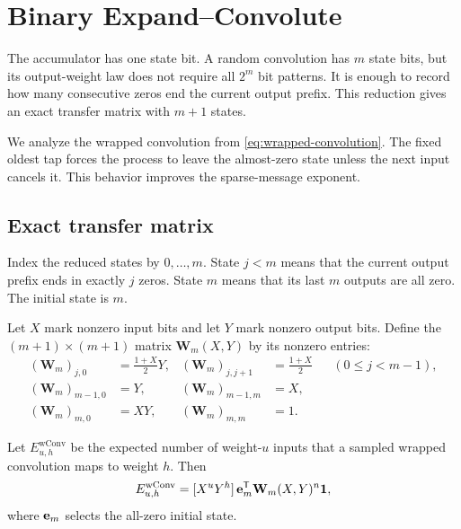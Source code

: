 \section{Binary Expand--Convolute}
\label{sec:binary-ec}

The accumulator has one state bit.  A random convolution has $m$ state bits,
but its output-weight law does not require all $2^m$ bit patterns.  It is
enough to record how many consecutive zeros end the current output prefix.
This reduction gives an exact transfer matrix with $m+1$ states.

We analyze the wrapped convolution from \eqref{eq:wrapped-convolution}.  The
fixed oldest tap forces the process to leave the almost-zero state unless the
next input cancels it.  This behavior improves the sparse-message exponent.

\subsection{Exact transfer matrix}

Index the reduced states by $0,\ldots,m$.  State $j<m$ means that the current
output prefix ends in exactly $j$ zeros.  State $m$ means that its last $m$
outputs are all zero.  The initial state is $m$.

Let $X$ mark nonzero input bits and let $Y$ mark nonzero output bits.  Define
the $(m+1)\times(m+1)$ matrix $\mathbf W_m(X,Y)$ by its nonzero entries:
\begin{align}
 (\mathbf W_m)_{j,0}&=\frac{1+X}{2}Y,&
 (\mathbf W_m)_{j,j+1}&=\frac{1+X}{2}
 &&(0\leq j<m-1),
 \label{eq:ec-active-transitions}\\
 (\mathbf W_m)_{m-1,0}&=Y,&
 (\mathbf W_m)_{m-1,m}&=X,
 \label{eq:ec-critical-transitions}\\
 (\mathbf W_m)_{m,0}&=XY,&
 (\mathbf W_m)_{m,m}&=1.
 \label{eq:ec-zero-transitions}
\end{align}

\begin{lemma}
\label{lem:ec-exact-enumerator}
Let $E^{\mathrm{wConv}}_{u,h}$ be the expected number of weight-$u$ inputs
that a sampled wrapped convolution maps to weight $h$.  Then
\begin{equation}
 E^{\mathrm{wConv}}_{u,h}=
 [X^uY^h]\,\mathbf e_m^{\mathsf T}\mathbf W_m(X,Y)^n\mathbf 1,
 \label{eq:ec-exact-enumerator}
\end{equation}
where $\mathbf e_m$ selects the all-zero initial state.
\end{lemma}


